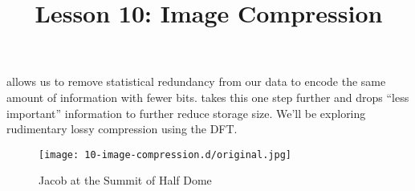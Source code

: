 \documentclass{article}
\title{Lesson 10: Image Compression}
\begin{document}
\renderTitle

 allows us to remove statistical redundancy from our
data to encode the same amount of information with fewer bits.
 takes this one step further and drops
\enquote{less important} information to further reduce storage size.
We'll be exploring rudimentary lossy compression using the DFT.

\begin{figure}[ht!]
	\texttt{[image: 10-image-compression.d/original.jpg]}
	\caption{Jacob at the Summit of Half Dome}
\end{figure}
\end{document}

